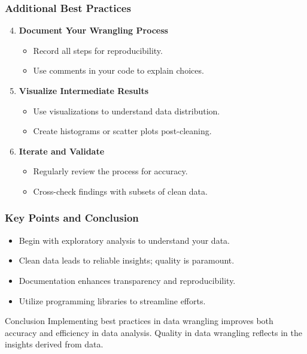 \documentclass[aspectratio=169]{beamer}
\begin{document}
\begin{frame}
    \frametitle{Additional Best Practices}
    \begin{enumerate}
        \setcounter{enumi}{3} %
        \item \textbf{Document Your Wrangling Process}
            \begin{itemize}
                \item Record all steps for reproducibility.
                \item Use comments in your code to explain choices.
            \end{itemize}
        \item \textbf{Visualize Intermediate Results}
            \begin{itemize}
                \item Use visualizations to understand data distribution.
                \item Create histograms or scatter plots post-cleaning.
            \end{itemize}
        \item \textbf{Iterate and Validate}
            \begin{itemize}
                \item Regularly review the process for accuracy.
                \item Cross-check findings with subsets of clean data.
            \end{itemize}
    \end{enumerate}
\end{frame}

\begin{frame}
    \frametitle{Key Points and Conclusion}
    \begin{itemize}
        \item Begin with exploratory analysis to understand your data.
        \item Clean data leads to reliable insights; quality is paramount.
        \item Documentation enhances transparency and reproducibility.
        \item Utilize programming libraries to streamline efforts.
    \end{itemize}
    
    \begin{block}{Conclusion}
        Implementing best practices in data wrangling improves both accuracy and efficiency in data analysis. Quality in data wrangling reflects in the insights derived from data.
    \end{block}
\end{frame}
\end{document}
